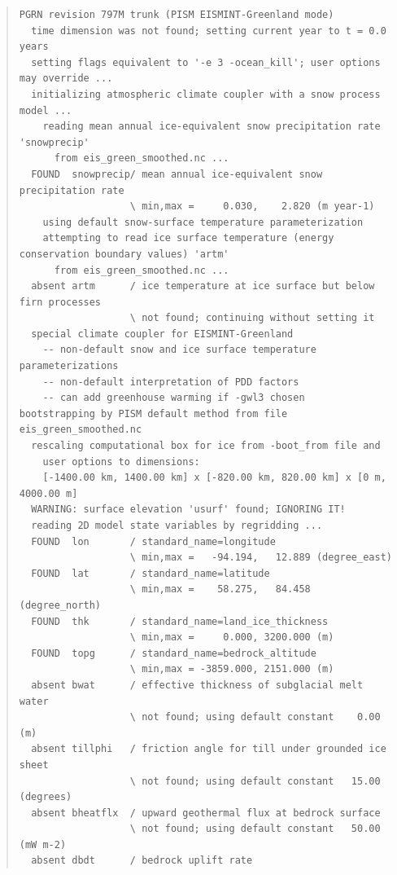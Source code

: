 \documentclass[11pt,final]{amsart}
\begin{document}
\begin{table}
\scriptsize
\begin{quote}
\begin{verbatim}
PGRN revision 797M trunk (PISM EISMINT-Greenland mode)
  time dimension was not found; setting current year to t = 0.0 years
  setting flags equivalent to '-e 3 -ocean_kill'; user options may override ...
  initializing atmospheric climate coupler with a snow process model ...
    reading mean annual ice-equivalent snow precipitation rate 'snowprecip'
      from eis_green_smoothed.nc ... 
  FOUND  snowprecip/ mean annual ice-equivalent snow precipitation rate          
                   \ min,max =     0.030,    2.820 (m year-1)
    using default snow-surface temperature parameterization
    attempting to read ice surface temperature (energy conservation boundary values) 'artm'
      from eis_green_smoothed.nc ...
  absent artm      / ice temperature at ice surface but below firn processes     
                   \ not found; continuing without setting it
  special climate coupler for EISMINT-Greenland
    -- non-default snow and ice surface temperature parameterizations
    -- non-default interpretation of PDD factors
    -- can add greenhouse warming if -gwl3 chosen
bootstrapping by PISM default method from file eis_green_smoothed.nc
  rescaling computational box for ice from -boot_from file and
    user options to dimensions:
    [-1400.00 km, 1400.00 km] x [-820.00 km, 820.00 km] x [0 m, 4000.00 m]
  WARNING: surface elevation 'usurf' found; IGNORING IT!
  reading 2D model state variables by regridding ...
  FOUND  lon       / standard_name=longitude                          
                   \ min,max =   -94.194,   12.889 (degree_east)
  FOUND  lat       / standard_name=latitude         
                   \ min,max =    58.275,   84.458 (degree_north)
  FOUND  thk       / standard_name=land_ice_thickness                              
                   \ min,max =     0.000, 3200.000 (m)
  FOUND  topg      / standard_name=bedrock_altitude                  
                   \ min,max = -3859.000, 2151.000 (m)
  absent bwat      / effective thickness of subglacial melt water                
                   \ not found; using default constant    0.00 (m)
  absent tillphi   / friction angle for till under grounded ice sheet            
                   \ not found; using default constant   15.00 (degrees)
  absent bheatflx  / upward geothermal flux at bedrock surface                   
                   \ not found; using default constant   50.00 (mW m-2)
  absent dbdt      / bedrock uplift rate                                         

\end{verbatim}
\end{quote}
\end{table}
\end{document}
